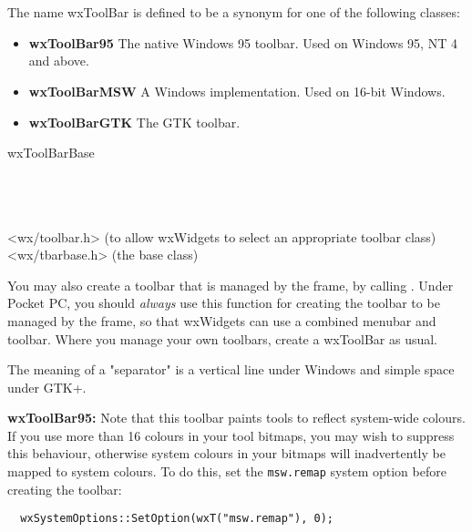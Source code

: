 \section{}\label{wxtoolbar}

The name wxToolBar is defined to be a synonym for one of the following classes:

\begin{itemize}\itemsep=0pt
\item {\bf wxToolBar95} The native Windows 95 toolbar. Used on Windows 95, NT 4 and above.
\item {\bf wxToolBarMSW} A Windows implementation. Used on 16-bit Windows.
\item {\bf wxToolBarGTK} The GTK toolbar.
\end{itemize}


wxToolBarBase\\
\\
\\
\\


<wx/toolbar.h> (to allow wxWidgets to select an appropriate toolbar class)\\
<wx/tbarbase.h> (the base class)


You may also create a toolbar that is managed by the frame, by
calling . Under Pocket PC,
you should {\it always} use this function for creating the toolbar
to be managed by the frame, so that wxWidgets can use a combined
menubar and toolbar. Where you manage your own toolbars, create a wxToolBar
as usual.

The meaning of a "separator" is a vertical line under Windows and simple space under GTK+.

{\bf wxToolBar95:} Note that this toolbar paints tools to reflect system-wide colours.
If you use more than 16 colours in your tool bitmaps, you may wish to suppress
this behaviour, otherwise system colours in your bitmaps will inadvertently be
mapped to system colours. To do this, set the {\tt msw.remap} system option
before creating the toolbar:

\begin{verbatim}
  wxSystemOptions::SetOption(wxT("msw.remap"), 0);
\end{verbatim}

